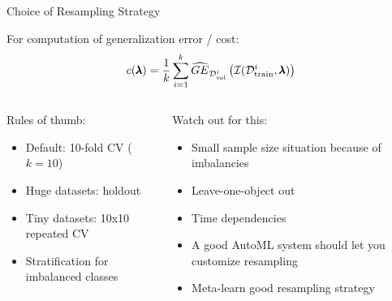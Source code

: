 \begin{frame}{Choice of Resampling Strategy}
  
  For computation of generalization error / cost:
  \begin{equation*}
    c(\pmb{\lambda}) = \frac{1}{k}\sum_{i = 1}^k \widehat{GE}_{\mathcal{D}_{\text{val}}^i}\left(\mathcal{I}(\mathcal{D}_{\text{train}}^i, \pmb{\lambda})\right)
  \end{equation*}

  \vspace{1em}
  \begin{columns}
    \begin{column}{0.5\textwidth}
    Rules of thumb:
    \begin{itemize}
      \item Default: 10-fold CV ($k=10$)
      \item Huge datasets: holdout
      \item Tiny datasets: 10x10 repeated CV
      \item Stratification for imbalanced classes
    \end{itemize}
    \end{column}
    
    \begin{column}{0.5\textwidth}
 Watch out for this:       
    \begin{itemize}
      \item Small sample size situation because of imbalancies    
      \item Leave-one-object out
      \item Time dependencies
      \item A good AutoML system should let you customize resampling
      \item Meta-learn good resampling strategy~
    \end{itemize}
    \end{column}
    \end{columns}
    
\end{frame}

